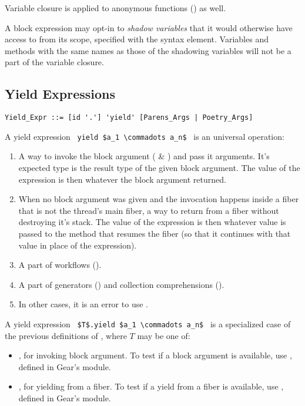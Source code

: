 Variable closure is applied to anonymous functions () as well. 

A block expression may opt-in to {\em shadow variables} that it would otherwise have access to from its scope, specified with the  syntax element. Variables and methods with the same names as those of the shadowing variables will not be a part of the variable closure. 





\subsection{Yield Expressions}
\label{sec:yield-expressions}

\syntax\begin{lstlisting}
Yield_Expr ::= [id '.'] 'yield' [Parens_Args | Poetry_Args]
\end{lstlisting}

A yield expression ~\lstinline!yield $a_1 \commadots a_n$!~ is an universal  operation:
\begin{enumerate}
  \item A way to invoke the block argument ( \& ) and pass it arguments. It's expected type is the result type of the given block argument. The value of the expression is then whatever the block argument returned. 
  \item When no block argument was given and the invocation happens inside a fiber that is not the thread's main fiber, a way to return from a fiber without destroying it's stack. The value of the expression is then whatever value is passed to the method that resumes the fiber (so that it continues with that value in place of the  expression). 
  \item A part of workflows ().
  \item A part of generators () and collection comprehensions ().
  \item In other cases, it is an error to use . 
\end{enumerate}

A yield expression ~\lstinline!$T$.yield $a_1 \commadots a_n$!~ is a specialized case of the previous definitions of , where $T$ may be one of:
\begin{itemize}
  \item {}, for invoking block argument. To test if a block argument is available, use , defined in Gear's  module. 
  \item {}, for yielding from a fiber. To test if a yield from a fiber is available, use , defined in Gear's  module. 
\end{itemize}





